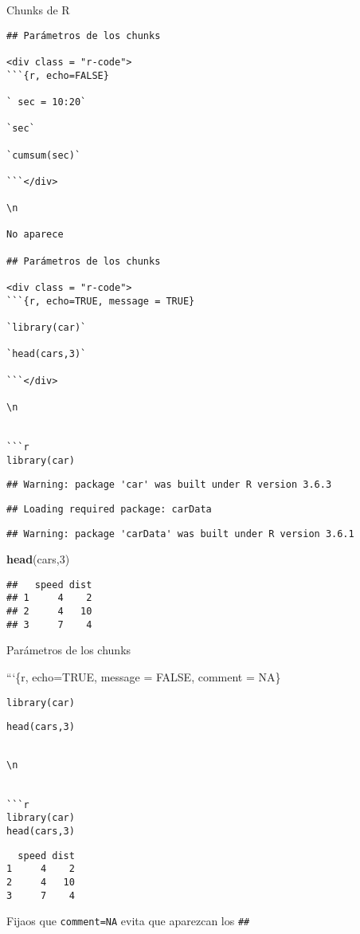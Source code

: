 \documentclass[
  ignorenonframetext,
]{beamer}
\newenvironment{Shaded}{\begin{snugshade}}{\end{snugshade}}
\newcommand{\DecValTok}[1]{\textcolor[rgb]{0.00,0.00,0.81}{#1}}
\newcommand{\KeywordTok}[1]{\textcolor[rgb]{0.13,0.29,0.53}{\textbf{#1}}}
\newcommand{\NormalTok}[1]{#1}
\begin{document}
\begin{frame}[fragile]{Chunks de R}
\begin{verbatim}
## Parámetros de los chunks

<div class = "r-code">
```{r, echo=FALSE}

` sec = 10:20`

`sec`

`cumsum(sec)`

```</div>

\n

No aparece

## Parámetros de los chunks

<div class = "r-code">
```{r, echo=TRUE, message = TRUE}

`library(car)`

`head(cars,3)`

```</div>

\n


```r
library(car)
\end{verbatim}

\begin{verbatim}
## Warning: package 'car' was built under R version 3.6.3
\end{verbatim}

\begin{verbatim}
## Loading required package: carData
\end{verbatim}

\begin{verbatim}
## Warning: package 'carData' was built under R version 3.6.1
\end{verbatim}

\begin{Shaded}
\begin{Highlighting}[]
\KeywordTok{head}\NormalTok{(cars,}\DecValTok{3}\NormalTok{)}
\end{Highlighting}
\end{Shaded}

\begin{verbatim}
##   speed dist
## 1     4    2
## 2     4   10
## 3     7    4
\end{verbatim}

\end{frame}

\begin{frame}[fragile]{Parámetros de los chunks}
\protect\hypertarget{paruxe1metros-de-los-chunks}{}

```\{r, echo=TRUE, message = FALSE, comment = NA\}

\texttt{library(car)}

\texttt{head(cars,3)}

\begin{verbatim}

\n


```r
library(car)
head(cars,3)
\end{verbatim}

\begin{verbatim}
  speed dist
1     4    2
2     4   10
3     7    4
\end{verbatim}

Fijaos que \texttt{comment=NA} evita que aparezcan los \texttt{\#\#}

\end{frame}
\end{document}
